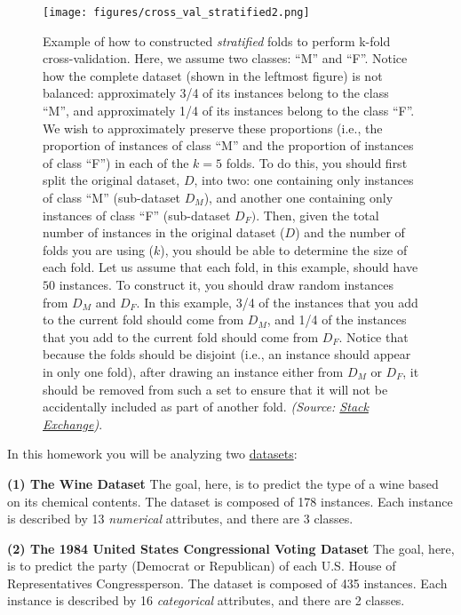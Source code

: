 \documentclass[letterpaper]{article}
\begin{document}
\vspace{2cm}

    \begin{figure}[hb!!]
        \centering
        \texttt{[image: figures/cross\_val\_stratified2.png]}
        \caption{Example of how to constructed \textit{stratified} folds to perform k-fold cross-validation. Here, we assume two classes: ``M'' and ``F''. Notice how the complete dataset (shown in the leftmost figure) is not balanced: approximately 3/4 of its instances belong to the class ``M'', and approximately 1/4 of its instances belong to the class ``F''. We wish to approximately preserve these proportions (i.e., the proportion of instances of class ``M'' and the proportion of instances of class ``F'') in each of the $k=5$ folds. To do this, you should first split the original dataset, $D$, into two: one containing only instances of class ``M'' (sub-dataset $D_M$), and another one containing only instances of class  ``F'' (sub-dataset $D_F)$. Then, given the total number of instances in the original dataset ($D$) and the number of folds you are using ($k$), you should be able to determine the size of each fold. Let us assume that each fold, in this example, should have $50$ instances. To construct it, you should draw random instances from $D_M$ and $D_F$. In this example, 3/4 of the instances that you add to the current fold should come from $D_M$, and 1/4 of the instances that you add to the current fold should come from $D_F$. Notice that because the folds should be disjoint (i.e., an instance should appear in only one fold), after drawing an instance either from $D_M$ or $D_F$, it should be removed from such a set to ensure that it will not be accidentally included as part of another fold. \textit{(Source: \href{https://stats.stackexchange.com/questions/49540/understanding-stratified-cross-validation}{Stack Exchange})}.}
        \label{fig:cross-val}
    \end{figure}

\clearpage
In this homework you will be analyzing two \href{https://people.cs.umass.edu/~bsilva/courses/CMPSCI_589/Spring2022/homeworks/hw3.zip}{datasets}:

\textbf{(1) The Wine Dataset}
The goal, here, is to predict the type of a wine based on its chemical contents. The dataset is composed of 178 instances. Each instance is described by 13 \textit{numerical} attributes, and there are 3 classes.

\textbf{(2) The 1984 United States Congressional Voting Dataset}
The goal, here, is to predict the party (Democrat or Republican) of each U.S. House of Representatives Congressperson. The dataset is composed of 435 instances. Each instance is described by 16 \textit{categorical} attributes, and there are 2 classes.
\end{document}
